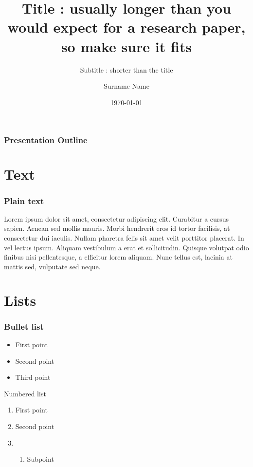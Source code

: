 \documentclass[
	11pt, %
	aspectratio=169, %
]{beamer}
\title{Title : usually longer than you would expect for a research paper, so make sure it fits}
\subtitle{Subtitle : shorter than the title}
\author{Surname Name}
\institute{ARAMIS Lab}
\date{\today}
\begin{document}

\begin{frame}
	\titlepage %
\end{frame}


\begin{frame}
	\frametitle{Presentation Outline} %
	\tableofcontents %
\end{frame}


\section{Text}

\begin{frame}
  \frametitle{Plain text}

  Lorem ipsum dolor sit amet, consectetur adipiscing elit. Curabitur a cursus sapien. Aenean sed mollis mauris. Morbi hendrerit eros id tortor facilisis, at consectetur dui iaculis. Nullam pharetra felis sit amet velit porttitor placerat. In vel lectus ipsum. Aliquam vestibulum a erat et sollicitudin. Quisque volutpat odio finibus nisi pellentesque, a efficitur lorem aliquam. Nunc tellus est, lacinia at mattis sed, vulputate sed neque.  

\end{frame}

\section{Lists}

\begin{frame}
  \frametitle{Bullet list}

  \begin{itemize}
    \item First point
    \item Second point
    \item Third point
  \end{itemize} 

\end{frame}

\begin{frame}{Numbered list}
  \begin{enumerate}
    \item First point
    \item Second point
    \item \begin{enumerate}
      \item Subpoint
    \end{enumerate} 
  \end{enumerate}

\end{frame}
\end{document}
